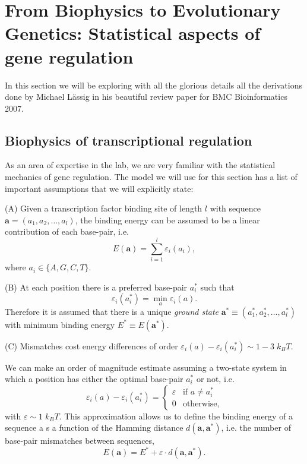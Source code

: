 \section{From Biophysics to Evolutionary Genetics: Statistical aspects of gene
regulation}

In this section we will be exploring with all the glorious details all the
derivations done by Michael L\"{a}ssig in his beautiful review paper for BMC
Bioinformatics 2007.

\subsection{Biophysics of transcriptional regulation}
As an area of expertise in the lab, we are very familiar with the statistical
mechanics of gene regulation. The model we will use for this section has a list
of important assumptions that we will explicitly state:

(A) Given a transcription factor binding site of length $l$ with sequence
$\mathbf{a} = (a_1, a_2, \ldots, a_l)$, the binding energy can be assumed to be
a linear contribution of each base-pair, i.e.
\begin{equation}
  E(\mathbf{a}) = \sum_{i=1}^l \varepsilon_i (a_i),
\end{equation}
where $a_i \in \{A, G, C, T \}$.

(B) At each position there is a preferred base-pair $a_i^*$ such that
\begin{equation}
  \varepsilon_i (a_i^*) = \min_a \varepsilon_i(a).
\end{equation}
Therefore it is assumed that there is a unique {\it ground state} $\mathbf{a}^*
\equiv (a_1^*, a_2^*, \ldots, a_l^*)$ with minimum binding energy $E^* \equiv
E(\mathbf{a}^*)$.

(C) Mismatches cost energy differences of order $\varepsilon_i (a) -
\varepsilon_i (a_i^*) \sim 1-3 \; k_BT$.

We can make an order of magnitude estimate assuming a two-state system in which
a position has either the optimal base-pair $a_i^*$ or not, i.e.
\begin{equation}
\varepsilon_i (a) - \varepsilon_i (a_i^*) =
\begin{cases}
  \varepsilon & \text{if } a \neq a_i^*\\
  0 & \text{otherwise},
\end{cases}
\end{equation}
with $\varepsilon \sim 1 \; k_BT$. This approximation allows us to define the
binding energy of a sequence a s a function of the Hamming distance
$d(\mathbf{a}, \mathbf{a^*})$, i.e. the number of base-pair mismatches between
sequences,
\begin{equation}
  E(\mathbf{a}) = E^* + \varepsilon \cdot d(\mathbf{a}, \mathbf{a^*}).
\end{equation}

